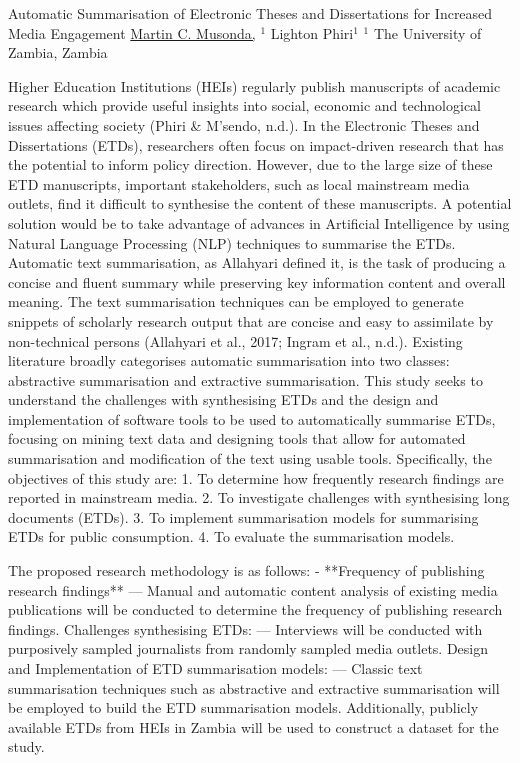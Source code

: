 \begin{abstract_online}{Automatic Summarisation of Electronic Theses and Dissertations for Increased Media Engagement}{%
    \underline{Martin C. Musonda,} $^{1}$ Lighton Phiri$^{1}$}{%
    }{%
    $^1$ The University of Zambia, Zambia}
    
Higher Education Institutions (HEIs) regularly publish manuscripts of academic research which provide useful insights into social, economic and technological issues affecting society (Phiri & M’sendo, n.d.). In the Electronic Theses and Dissertations (ETDs), researchers often focus on impact-driven research that has the potential to inform policy direction. However, due to the large size of these ETD manuscripts, important stakeholders, such as local mainstream media outlets, find it difficult to synthesise the content of these manuscripts. A potential solution would be to take advantage of advances in Artificial Intelligence by using Natural Language Processing (NLP) techniques to summarise the ETDs. Automatic text summarisation, as Allahyari defined it, is the task of producing a concise and fluent summary while preserving key information content and overall meaning. The text summarisation techniques can be employed to generate snippets of scholarly research output that are concise and easy to assimilate by non-technical persons (Allahyari et al., 2017; Ingram et al., n.d.). Existing literature broadly categorises automatic summarisation into two classes: abstractive summarisation and extractive summarisation. This study seeks to understand the challenges with synthesising ETDs and the design and implementation of software tools to be used to automatically summarise ETDs, focusing on mining text data and designing tools that allow for automated summarisation and modification of the text using usable tools. Specifically, the objectives of this study are: 
1. To determine how frequently research findings are reported in mainstream media. 
2. To investigate challenges with synthesising long documents (ETDs). 
3. To implement summarisation models for summarising ETDs for public consumption. 
4. To evaluate the summarisation models. 

The proposed research methodology is as follows:
- **Frequency of publishing research findings** — Manual and automatic content analysis of existing media publications will be conducted to determine the frequency of publishing research findings. 
Challenges synthesising ETDs: — Interviews will be conducted with purposively sampled journalists from randomly sampled media outlets. 
Design and Implementation of ETD summarisation models: — Classic text summarisation techniques such as abstractive and extractive summarisation will be employed to build the ETD summarisation models. Additionally, publicly available ETDs from HEIs in Zambia will be used to construct a dataset for the study. 


\end{abstract_online}

